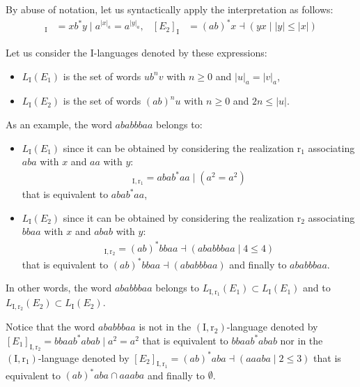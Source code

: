 \documentclass[a4paper]{llncs}
\begin{document}
\begin{example}
    By abuse of notation, let us syntactically apply the interpretation as follows:
    \begin{align*}
      [E_1]_{\mathrm{I}}&=xb^*y\mid a^{|x|_a}=a^{|y|_a},& [E_2]_{\mathrm{I}}&=(ab)^*x \dashv (yx\mid |y|\leq |x|)
    \end{align*}
    
    Let us consider the $\mathrm{I}$-languages denoted by these expressions:
    \begin{itemize}
      \item $L_\mathrm{I}(E_1)$ is the set of words $ub^nv$ with $n\geq 0$ and $|u|_a=|v|_a$,
      \item $L_\mathrm{I}(E_2)$ is the set of words $(ab)^n u$ with $n\geq 0$ and $2n\leq |u|$. 
    \end{itemize}
    
    As an example, the word $ababbbaa$ belongs to:
    \begin{itemize}
      \item $L_\mathrm{I}(E_1)$ since it can be obtained by considering the realization $\mathrm{r}_1$ associating $aba$ with $x$ and $aa$ with $y$: 
    \begin{align*}
        [E_1]_{\mathrm{I},\mathrm{r}_1}=aba b^*aa \mid (a^{2}=a^{2}) 
    \end{align*}
that is equivalent to  $abab^*aa$,
      \item $L_\mathrm{I}(E_2)$ since it can be obtained by considering the realization $\mathrm{r}_2$ associating $bbaa$ with $x$ and $abab$ with $y$: 
    \begin{align*}
        [E_2]_{\mathrm{I},\mathrm{r}_2}=(ab)^*bbaa \dashv (ababbbaa\mid 4\leq 4)
    \end{align*}
    that is equivalent to $(ab)^*bbaa \dashv (ababbbaa)$ and finally to $ababbbaa$.
    \end{itemize}
    
    In other words, the word $ababbbaa$ belongs to $L_\mathrm{I,\mathrm{r}_1}(E_1)\subset L_\mathrm{I}(E_1)$ and to $L_\mathrm{I,\mathrm{r}_2}(E_2)\subset L_\mathrm{I}(E_2)$.
    
    Notice that the word $ababbbaa$ is not in the $(\mathrm{I},\mathrm{r}_2)$-language denoted by $[E_1]_{\mathrm{I},\mathrm{r}_2}=bbaab^*abab\mid a^{2}=a^{2}$ that is equivalent to $bbaab^*abab$ nor in the $(\mathrm{I},\mathrm{r}_1)$-language denoted by $[E_2]_{\mathrm{I},\mathrm{r}_1}=(ab)^*aba \dashv (aaaba\mid 2\leq 3)$ that is equivalent to $(ab)^*aba \cap aaaba$ and finally to $\emptyset$. 
  \end{example}
\end{document}
